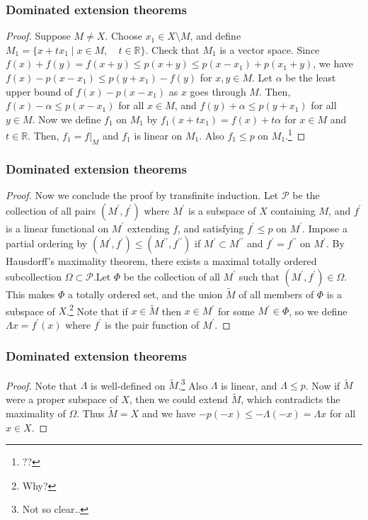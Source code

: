 \documentclass{beamer}
\begin{document}
\begin{frame}
\frametitle{Dominated extension theorems}
\begin{proof}\renewcommand{\qedsymbol}{}
    Suppose $M \neq X$. Choose $x_1 \in X \setminus M$, and define $M_1 = \{x+tx_1\mid x\in M,\quad t\in \mathbb{R}\}$. Check that $M_1$ is a vector space. Since $f(x) + f(y) = f(x+y) \leq p(x+y) \leq p(x-x_1) + p(x_1+y)$, we have $f(x) - p(x-x_1) \leq p(y+x_1) - f(y)$ for $x,y\in M$. Let $\alpha$ be the least upper bound of $f(x) - p(x-x_1)$ as $x$ goes through $M$. Then, $f(x) -\alpha \leq p(x-x_1)$ for all $x \in M$, and $f(y) + \alpha \leq p(y+x_1)$ for all $y \in M$. \newline\newline Now we define $f_1$ on $M_1$ by $f_1(x+tx_1) = f(x)+t\alpha$ for $x \in M$ and $t\in \mathbb{R}$. Then, $f_1 = f|_M$ and $f_1$ is linear on $M_1$. Also $f_1 \leq p$ on $M_1$.\footnote{??}
\end{proof}
\end{frame}
\begin{frame}
\frametitle{Dominated extension theorems}
\begin{proof}\renewcommand{\qedsymbol}{}
    Now we conclude the proof by transfinite induction. Let $\mathcal{P}$ be the collection of all pairs $(M^\prime,f^\prime)$ where $M^\prime$ is a subspace of $X$ containing $M$, and $f^\prime$ is a linear functional on $M^\prime$ extending $f$, and satisfying $f^\prime \leq p$ on $M^\prime$. Impose a partial ordering by $(M^\prime,f^\prime) \leq (M^{\prime\prime},f^{\prime\prime})$ if $M^\prime \subset M^{\prime\prime}$ and $f^\prime = f^{\prime\prime}$ on $M^\prime$. By Hausdorff's maximality theorem, there exists a maximal totally ordered subcollection $\Omega \subset \mathcal{P}$.\newline\newline Let $\Phi$ be the collection of all $M^\prime$ such that $(M^\prime,f^\prime) \in \Omega$. This makes $\Phi$ a totally ordered set, and the union $\tilde{M}$ of all members of $\Phi$ is a subspace of $X$.\footnote{Why?} Note that if $x \in \tilde{M}$ then $x\in M^\prime$ for some $M^\prime \in \Phi$, so we define $\Lambda x = f^\prime(x)$ where $f^\prime$ is the pair function of $M^\prime$.
\end{proof}
\end{frame}
\begin{frame}
\frametitle{Dominated extension theorems}
\begin{proof}
    Note that $\Lambda$ is well-defined on $\tilde{M}$.\footnote{Not so clear..} Also $\Lambda$ is linear, and $\Lambda \leq p$. Now if $\tilde{M}$ were a proper subspace of $X$, then we could extend $\tilde{M}$, which contradicts the maximality of $\Omega$. Thus $\tilde{M} = X$ and we have $-p(-x) \leq -\Lambda(-x) = \Lambda x$ for all $x\in X$. 
\end{proof}
\end{frame}
\end{document}
